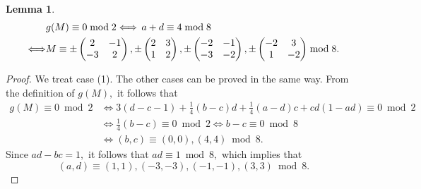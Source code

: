 \documentclass[12pt]{article}
\theoremstyle{definition}
\newtheorem{lemma}[theorem]{Lemma}
\numberwithin{equation}{section}
\numberwithin{theorem}{section}
\begin{document}
\begin{lemma}
{\begin{align}
\label{eqn:level3-mod4-pmT-c-even}
&g(M)\equiv 0 \bmod{2} 
\Longleftrightarrow \,
a+d\equiv 4 \bmod{8} \notag \\
\Longleftrightarrow&
M
\equiv 
\pm
\begin{pmatrix}
2 & -1 \\
-3 & 2
\end{pmatrix}, 
\pm
\begin{pmatrix}
2 & 3 \\
1 & 2
\end{pmatrix}, 
\pm
\begin{pmatrix}
-2 & -1 \\
-3 & -2
\end{pmatrix}, 
\pm
\begin{pmatrix}
-2 & 3 \\
1 & -2
\end{pmatrix} 
\bmod{8}.
\end{align}
}
\end{lemma}






\begin{proof}
We treat case (1). The other cases can be proved in the same way. 
From the definition of $g(M),$ it follows that 
\begin{align*}
g(M)\equiv 0 \bmod{2} &\Longleftrightarrow 
3(d-c-1)+\frac14(b-c)d+\frac14(a-d)c+cd(1-ad)  \equiv 0 \bmod{2}   \\
&\Longleftrightarrow
\frac14(b-c)\equiv 0 \bmod{2}  
\Longleftrightarrow
b-c\equiv 0 \bmod{8}   \\
&\Longleftrightarrow
(b,c)\equiv (0,0), (4,4) \bmod{8}. 
\end{align*}
Since $ad-bc=1,$ it follows that 
$ad\equiv 1 \bmod{8},$ 
which implies that 
\begin{equation*}
(a,d)\equiv 
(1,1), (-3,-3), (-1,-1), (3,3) \bmod{8}.
\end{equation*}
\end{proof}
\end{document}
